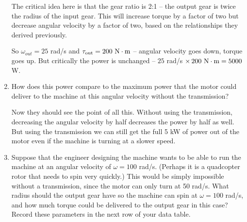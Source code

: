\documentclass[12pt]{article}
\begin{document}
\begin{enumerate}
{\color{red}
	
	The critical idea here is that the gear ratio is 2:1 -- the output gear is twice the radius of the input gear. This will increase torque by a factor of two but decrease angular velocity by a factor of two, based on the relationships they derived previously.
	
	So $\omega_{out} = 25$ rad/s and $\tau_{\rm {out}}=200~\rm N \cdot \rm m$ -- angular velocity goes down, torque goes up. But critically the power is unchanged -- $25$ rad/s $ \times\, 200~\rm N \cdot \rm m = 5000$ W.
	
}


\item How does this power compare to the maximum power that the motor could deliver to the machine at this angular velocity without the transmission?

{\color{red}
	
	Now they should see the point of all this. Without using the transmission, decreasing the angular velocity by half decreases the power by half as well. But using the transmission we can still get the full 5 kW of power out of the motor even if the machine is turning at a slower speed.
	
}

\vspace{1.5in}


\item Suppose that the engineer designing the machine wants to be able to run the machine at an angular velocity of $\omega = 100$ rad/s. (Perhaps
	it is a quadcopter rotor that needs to spin very quickly.) This would be simply impossible without a transmission, since the motor can only turn at 50 rad/s. What radius should the output gear have so the machine can spin at $\omega = 100$ rad/s, and how much torque could be delivered to the output
	gear in this case? Record these parameters in the next row of your data table.



\end{enumerate}
\end{document}
